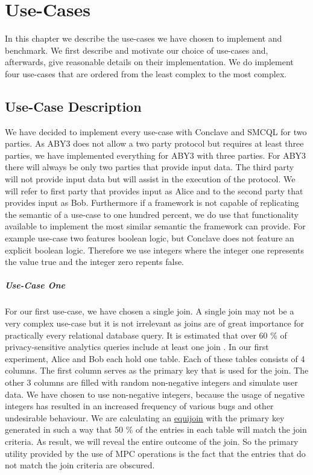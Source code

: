 \chapter{Use-Cases}
In this chapter we describe the use-cases we have chosen to implement and benchmark. We first describe and motivate our choice of use-cases and, afterwards, give reasonable details on their implementation. We do implement four use-cases that are ordered from the least complex to the most complex.
\section{Use-Case Description} 
We have decided to implement every use-case with Conclave and SMCQL for two parties. As ABY3 does not allow a two party protocol but requires at least three parties, we have implemented everything for ABY3 with three parties. For ABY3 there will always be only two parties that provide input data. The third party will not provide input data but will assist in the execution of the protocol. We will refer to first party that provides input as Alice and to the second party that provides input as Bob. Furthermore if a framework is not capable of replicating the semantic of a use-case to one hundred percent, we do use that functionality available to implement the most similar semantic the framework can provide. For example use-case two features boolean logic, but Conclave does not feature an explicit boolean logic. Therefore we use integers where the integer one represents the value true and the integer zero repents false.   
\paragraph{Use-Case One}
For our first use-case, we have chosen a single join. A single join may not be a very complex use-case but it is not irrelevant as joins are of great importance for practically every relational database query. It is estimated that over 60 \% of privacy-sensitive analytics queries include at least one join \cite{johnson2017practical}. In our first experiment, Alice and Bob each hold one table. Each of these tables consists of 4 columns. The first column serves as the primary key that is used for the join. The other 3 columns are filled with random non-negative integers and simulate user data. We have chosen to use non-negative integers, because the usage of negative integers has resulted in an  increased frequency of various bugs and other undesirable behaviour. We are calculating an \hyperref[Databases]{equijoin}  with the primary key generated in such a way that 50 \% of the entries in each table will match the join criteria. As result, we will reveal the entire outcome of the join. So the primary utility provided by the use of MPC operations is the fact that the entries that do not match the join criteria are obscured.

